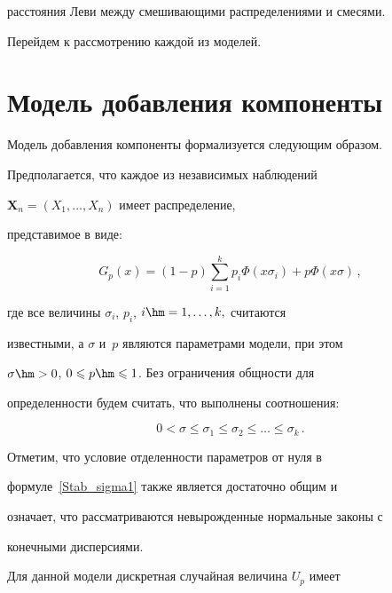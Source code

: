 расстояния Леви между смешивающими распределениями и смесями.

Перейдем к рассмотрению каждой из моделей.



\section{Модель добавления компоненты}



Модель добавления компоненты формализуется следующим образом.

Предполагается, что каждое из независимых наблюдений

$\mathbf{X}_n=(X_1,\ldots,X_n)$ имеет распределение,

представимое в виде:

\begin{equation}

\label{Stab_G_p1}

G_p(x)=(1-p)\sum\limits_{i=1}^k

p_i\Phi(x\sigma_i)+p\Phi(x\sigma)\,,

\end{equation}

где все величины $\sigma_i$, $p_i$, $i\hm=1,\ldots,k,$ считаются

известными, а $\sigma$ и~$p$ являются параметрами модели, при этом

$\sigma\hm>0$, $0\leqslant p\hm\leqslant 1$. Без ограничения общности для

определенности будем считать, что выполнены соотношения:

\begin{equation}

\label{Stab_sigma1}

0<\sigma\leqslant\sigma_1\leqslant\sigma_2\leqslant\ldots\leqslant\sigma_k\,.

\end{equation}



Отметим, что условие отделенности параметров от нуля в

формуле~\eqref{Stab_sigma1} также является достаточно общим и

означает, что рассматриваются невырожденные нормальные законы с

конечными дисперсиями.



Для данной модели дискретная случайная величина $U_p$ имеет

